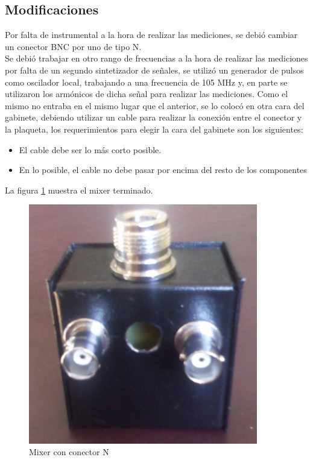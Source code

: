 \documentclass[a4paper,10pt]{article}
\begin{document}
	\subsection{Modificaciones}
	\indent Por falta de instrumental a la hora de realizar las mediciones, se 
	debió cambiar un conector BNC por uno de tipo N. \\
	\indent Se debió trabajar en otro rango de frecuencias a la hora de realizar
	las mediciones por falta de un segundo sintetizador de señales, se utilizó 
	un generador de pulsos como oscilador local, trabajando a una frecuencia de 
	105 MHz y, en parte se utilizaron los armónicos de dicha señal para realizar
	las mediciones.
	\indent Como el mismo no entraba en el mismo lugar que el anterior, se lo 
	colocó en otra cara del gabinete, debiendo utilizar un cable para realizar 
	la conexión entre el conector y la plaqueta, los requerimientos para elegir 
	la cara del gabinete son los siguientes:
	
	\begin{itemize}
		\item El cable debe ser lo más corto posible.
		\item En lo posible, el cable no debe pasar por encima del resto de los 
		componentes
	\end{itemize}

	\indent La figura \ref{mixerNuevo} muestra el mixer terminado.

	\begin{figure}[!htb]
		\centering
		\includegraphics[width=10cm]{Images/modifiedMixer.png}
		\caption{Mixer con conector N}
		\label{mixerNuevo}
	\end{figure}
\end{document}
